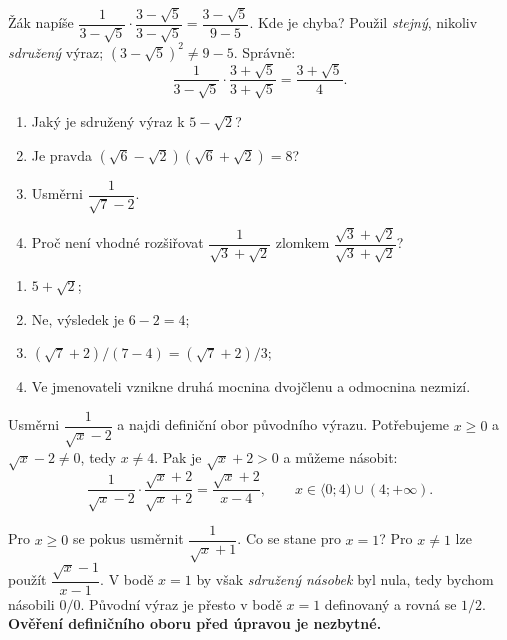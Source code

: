 \documentclass[11pt,a4paper]{article}
\begin{document}
\begin{prikladReseniBox}[breakable=false,title={Příklad 3}]
Žák napíše $\dfrac1{3-\sqrt5}\cdot\dfrac{3-\sqrt5}{3-\sqrt5}
=\dfrac{3-\sqrt5}{9-5}$. Kde je chyba?
\tcblower
Použil \emph{stejný}, nikoliv \emph{sdružený} výraz;
$(3-\sqrt5)^2\ne9-5$.
Správně:
\[
\frac1{3-\sqrt5}\cdot\frac{3+\sqrt5}{3+\sqrt5}
=\boxed{\frac{3+\sqrt5}{4}}.
\]
\end{prikladReseniBox}

\begin{zadaniReseniBox}[breakable=false,title={Samostatná práce 3}]
\begin{enumerate}[label=\alph*)]
\item Jaký je sdružený výraz k $5-\sqrt2$?
\item Je pravda $(\sqrt6-\sqrt2)(\sqrt6+\sqrt2)=8$?
\item Usměrni $\dfrac{1}{\sqrt7-2}$.
\item Proč není vhodné rozšiřovat $\dfrac1{\sqrt3+\sqrt2}$ zlomkem
$\dfrac{\sqrt3+\sqrt2}{\sqrt3+\sqrt2}$?
\end{enumerate}
\tcblower
\begin{enumerate}[label=\alph*)]
\item $5+\sqrt2$;
\item Ne, výsledek je $6-2=4$;
\item $(\sqrt7+2)/(7-4)=(\sqrt7+2)/3$;
\item Ve jmenovateli vznikne druhá mocnina dvojčlenu a odmocnina nezmizí.
\end{enumerate}
\end{zadaniReseniBox}

\begin{prikladReseniBox}[breakable=false,title={Rozšíření 1}]
Usměrni $\dfrac1{\sqrt{x}-2}$ a najdi definiční obor původního výrazu.
\tcblower
Potřebujeme $x\ge0$ a $\sqrt x-2\ne0$, tedy $x\ne4$.
Pak je $\sqrt x+2>0$ a můžeme násobit:
\[
\frac1{\sqrt x-2}\cdot\frac{\sqrt x+2}{\sqrt x+2}
=\boxed{\frac{\sqrt x+2}{x-4}},
\qquad x\in\langle0;4)\cup(4;+\infty).
\]
\end{prikladReseniBox}
\begin{zadaniReseniBox}[breakable=false,title={Rozšíření 2}]
Pro $x\ge0$ se pokus usměrnit $\dfrac1{\sqrt x+1}$.
Co se stane pro $x=1$?
\tcblower
Pro $x\ne1$ lze použít
$\dfrac{\sqrt x-1}{x-1}$. V bodě $x=1$ by však
\emph{sdružený násobek} byl nula, tedy bychom násobili $0/0$.
Původní výraz je přesto v bodě $x=1$ definovaný a rovná se $1/2$.
\textbf{Ověření definičního oboru před úpravou je nezbytné.}
\end{zadaniReseniBox}
\end{document}
